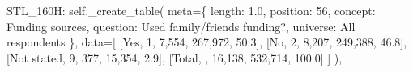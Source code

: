 \documentclass[
  11pt,
  a4paper,
]{article}
\newenvironment{Shaded}{\begin{snugshade}}{\end{snugshade}}
\newcommand{\NormalTok}[1]{\textcolor[rgb]{0.00,0.23,0.31}{#1}}
\newcommand{\OperatorTok}[1]{\textcolor[rgb]{0.37,0.37,0.37}{#1}}
\newcommand{\StringTok}[1]{\textcolor[rgb]{0.13,0.47,0.30}{#1}}
\newcommand{\VariableTok}[1]{\textcolor[rgb]{0.07,0.07,0.07}{#1}}
\begin{document}
\begin{Shaded}
\begin{Highlighting}[]
            \StringTok{\textquotesingle{}STL\_160H\textquotesingle{}}\NormalTok{: }\VariableTok{self}\NormalTok{.\_create\_table(}
\NormalTok{                meta}\OperatorTok{=}\NormalTok{\{}
                    \StringTok{\textquotesingle{}length\textquotesingle{}}\NormalTok{: }\StringTok{\textquotesingle{}1.0\textquotesingle{}}\NormalTok{, }\StringTok{\textquotesingle{}position\textquotesingle{}}\NormalTok{: }\StringTok{\textquotesingle{}56\textquotesingle{}}\NormalTok{,}
                    \StringTok{\textquotesingle{}concept\textquotesingle{}}\NormalTok{: }\StringTok{\textquotesingle{}Funding sources\textquotesingle{}}\NormalTok{,}
                    \StringTok{\textquotesingle{}question\textquotesingle{}}\NormalTok{: }\StringTok{\textquotesingle{}Used family/friends funding?\textquotesingle{}}\NormalTok{,}
                    \StringTok{\textquotesingle{}universe\textquotesingle{}}\NormalTok{: }\StringTok{\textquotesingle{}All respondents\textquotesingle{}}
\NormalTok{                \},}
\NormalTok{                data}\OperatorTok{=}\NormalTok{[}
\NormalTok{                    [}\StringTok{\textquotesingle{}Yes\textquotesingle{}}\NormalTok{, }\StringTok{\textquotesingle{}1\textquotesingle{}}\NormalTok{, }\StringTok{\textquotesingle{}7,554\textquotesingle{}}\NormalTok{, }\StringTok{\textquotesingle{}267,972\textquotesingle{}}\NormalTok{, }\StringTok{\textquotesingle{}50.3\textquotesingle{}}\NormalTok{],}
\NormalTok{                    [}\StringTok{\textquotesingle{}No\textquotesingle{}}\NormalTok{, }\StringTok{\textquotesingle{}2\textquotesingle{}}\NormalTok{, }\StringTok{\textquotesingle{}8,207\textquotesingle{}}\NormalTok{, }\StringTok{\textquotesingle{}249,388\textquotesingle{}}\NormalTok{, }\StringTok{\textquotesingle{}46.8\textquotesingle{}}\NormalTok{],}
\NormalTok{                    [}\StringTok{\textquotesingle{}Not stated\textquotesingle{}}\NormalTok{, }\StringTok{\textquotesingle{}9\textquotesingle{}}\NormalTok{, }\StringTok{\textquotesingle{}377\textquotesingle{}}\NormalTok{, }\StringTok{\textquotesingle{}15,354\textquotesingle{}}\NormalTok{, }\StringTok{\textquotesingle{}2.9\textquotesingle{}}\NormalTok{],}
\NormalTok{                    [}\StringTok{\textquotesingle{}Total\textquotesingle{}}\NormalTok{, }\StringTok{\textquotesingle{}\textquotesingle{}}\NormalTok{, }\StringTok{\textquotesingle{}16,138\textquotesingle{}}\NormalTok{, }\StringTok{\textquotesingle{}532,714\textquotesingle{}}\NormalTok{, }\StringTok{\textquotesingle{}100.0\textquotesingle{}}\NormalTok{]}
\NormalTok{                ]}
\NormalTok{            ),}
            

\end{Highlighting}
\end{Shaded}
\end{document}
